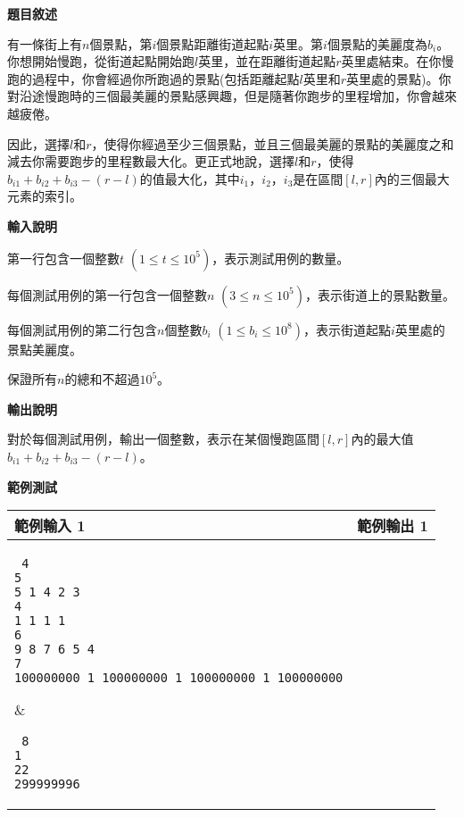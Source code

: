     \textbf{題目敘述}

    有一條街上有$n$個景點，第$i$個景點距離街道起點$i$英里。第$i$個景點的美麗度為$b_i$。你想開始慢跑，從街道起點開始跑$l$英里，並在距離街道起點$r$英里處結束。在你慢跑的過程中，你會經過你所跑過的景點(包括距離起點$l$英里和$r$英里處的景點)。你對沿途慢跑時的三個最美麗的景點感興趣，但是隨著你跑步的里程增加，你會越來越疲倦。

    因此，選擇$l$和$r$，使得你經過至少三個景點，並且三個最美麗的景點的美麗度之和減去你需要跑步的里程數最大化。更正式地說，選擇$l$和$r$，使得$b_{i1}+b_{i2}+b_{i3}-(r-l)$的值最大化，其中$i_1，i_2，i_3$是在區間$[l,r]$內的三個最大元素的索引。

    \textbf{輸入說明}

    第一行包含一個整數$t$ $(1 \le t \le 10^5)$，表示測試用例的數量。

    每個測試用例的第一行包含一個整數$n$ $(3 \le n \le 10^5)$，表示街道上的景點數量。
    
    每個測試用例的第二行包含$n$個整數$b_i$ $(1 \le b_i \le 10^8)$，表示街道起點$i$英里處的景點美麗度。
    
    保證所有$n$的總和不超過$10^5$。

    \textbf{輸出說明}

    對於每個測試用例，輸出一個整數，表示在某個慢跑區間$[l,r]$內的最大值$b_{i1}+b_{i2}+b_{i3}-(r-l)$。

    \textbf{範例測試}

    \begin{tabular}{|m{7cm}|m{7cm}|}
        \hline
        範例輸入 1 & 範例輸出 1 \\
        \hline
        \parbox[t]{7cm} %
        { \tt
        4 \\
        5 \\
        5 1 4 2 3 \\
        4 \\
        1 1 1 1 \\
        6 \\
        9 8 7 6 5 4 \\
        7 \\
        100000000 1 100000000 1 100000000 1 100000000 \\        
        } &
        \parbox[t]{7cm}
        { \tt
        8 \\
        1 \\
        22 \\
        299999996 \\        
        } \\
        \hline
    \end{tabular}


